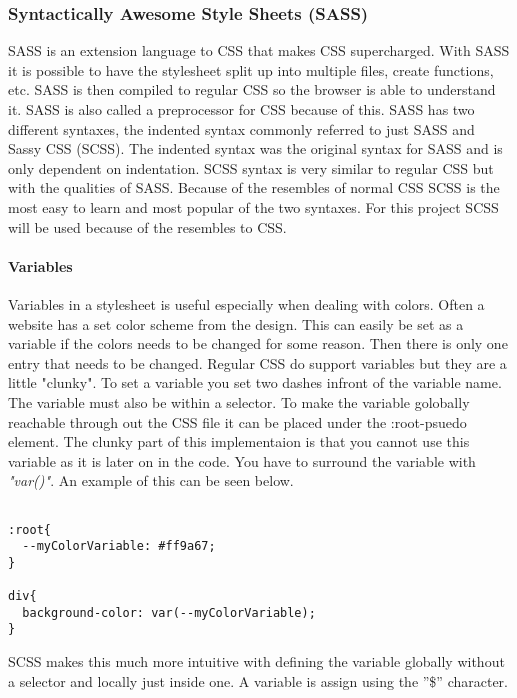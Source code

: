 \subsubsection{Syntactically Awesome Style Sheets (SASS)}%
\label{sub:sass}
SASS is an extension language to CSS that makes CSS supercharged. With SASS it is possible to have the stylesheet split up into multiple files, create functions, etc. SASS is then compiled to regular CSS so the browser is able to understand it. SASS is also called a preprocessor for CSS because of this.  SASS has two different syntaxes, the indented syntax commonly referred to just SASS and Sassy CSS (SCSS). The indented syntax was the original syntax for SASS and is only dependent on indentation. SCSS syntax is very similar to regular CSS but with the qualities of SASS. Because of the resembles of normal CSS SCSS is the most easy to learn and most popular of the two syntaxes. For this project SCSS will be used because of the resembles to CSS.

\paragraph{Variables}
Variables in a stylesheet is useful especially when dealing with colors. Often a website has a set color scheme from the design. This can easily be set as a variable if the colors needs to be changed for some reason. Then there is only one entry that needs to be changed. Regular CSS do support variables but they are a little "clunky". To set a variable you set two dashes infront of the variable name. The variable must also be within a selector. To make the variable golobally reachable through out the CSS file it can be placed under the :root-psuedo element. The clunky part of this implementaion is that you cannot use this variable as it is later on in the code. You have to surround the variable with \textit{"var()"}. An example of this can be seen below.

\begin{lstlisting}[style=htmlcssjs]

:root{
  --myColorVariable: #ff9a67; 
}

div{
  background-color: var(--myColorVariable);
}
\end{lstlisting}



SCSS makes this much more intuitive with defining the variable globally without a selector and locally just inside one. A variable is assign using the ''\$'' character.

